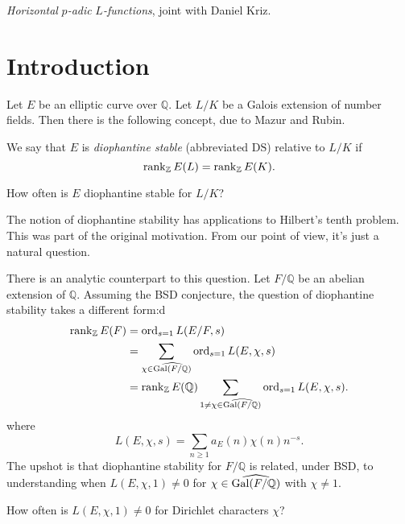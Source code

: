 \documentclass[reqno]{amsart} 
\begin{document}
\emph{Horizontal} $p$\emph{-adic} $L$\emph{-functions}, joint with Daniel Kriz.

\section{Introduction}
Let $E$ be an elliptic curve over $\mathbb{Q}$.  Let $L/K$ be a Galois extension of number fields.  Then there is the following concept, due to Mazur and Rubin.
\begin{definition}
  We say that $E$ is \emph{diophantine stable} (abbreviated $\mathrm{D S}$) relative to $L/K$ if
  \begin{equation*}
    \operatorname{rank}_{\mathbb{Z}} E(L) = \operatorname{rank}_{\mathbb{Z}} E(K).
  \end{equation*}
\end{definition}
\begin{question}
  How often is $E$ diophantine stable for $L/K$?
\end{question}
\begin{remark}
  The notion of diophantine stability has applications to Hilbert's tenth problem.  This was part of the original motivation.  From our point of view, it's just a natural question.
\end{remark}
There is an analytic counterpart to this question.  Let $F /\mathbb{Q}$ be an abelian extension of $\mathbb{Q}$.  Assuming the BSD conjecture, the question of diophantine stability takes a different form:d
\begin{align*}
  \operatorname{rank}_{\mathbb{Z}} E(F)
  &= \operatorname{ord}_{s = 1} L(E/F, s) \\
  &=
  \sum_{\chi \in \widehat{\operatorname{Gal}(F / \mathbb{Q})}}
    \operatorname{ord}_{s = 1} L(E, \chi, s) \\
  &=
    \operatorname{rank}_{\mathbb{Z}} E(\mathbb{Q})
    \sum_{1 \neq \chi \in \widehat{\operatorname{Gal}(F / \mathbb{Q})}}
    \operatorname{ord}_{s = 1} L(E, \chi, s).
\end{align*}
where
\begin{equation*}
  L(E, \chi, s) = \sum_{n \geq 1} a_E(n) \chi(n) n^{- s}.
\end{equation*}
The upshot is that diophantine stability for $F/\mathbb{Q}$ is related, under BSD, to understanding when $L(E, \chi, 1) \neq 0$ for $\chi \in \widehat{\operatorname{Gal}(F / \mathbb{Q})}$ with $\chi \neq 1$.

\begin{question}
  How often is $L(E, \chi, 1) \neq 0$ for Dirichlet characters $\chi$?
\end{question}
\end{document}
